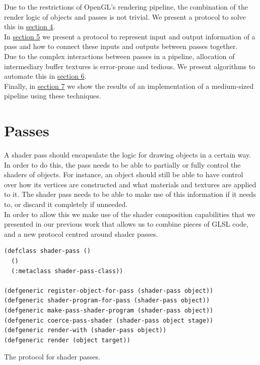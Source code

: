 \documentclass[format=sigconf]{acmart}
\begin{document}
Due to the restrictions of OpenGL's rendering pipeline, the combination of the render logic of objects and passes is not trivial. We present a protocol to solve this in \hyperref[passes]{section 4}. \\

In \hyperref[pipelines]{section 5} we present a protocol to represent input and output information of a pass and how to connect these inputs and outputs between passes together. \\

Due to the complex interactions between passes in a pipeline, allocation of intermediary buffer textures is error-prone and tedious. We present algorithms to automate this in \hyperref[allocation]{section 6}. \\

Finally, in \hyperref[concept]{section 7} we show the results of an implementation of a medium-sized pipeline using these techniques.

\section{Passes}\label{passes}
A shader pass should encapsulate the logic for drawing objects in a certain way. In order to do this, the pass needs to be able to partially or fully control the shaders of objects. For instance, an object should still be able to have control over how its vertices are constructed and what materials and textures are applied to it. The shader pass needs to be able to make use of this information if it needs to, or discard it completely if unneeded. \\

In order to allow this we make use of the shader composition capabilities that we presented in our previous work\cite{glsloop} that allows us to combine pieces of GLSL code, and a new protocol centred around shader passes.

\begin{listing}[h]
\begin{verbatim}
(defclass shader-pass ()
  ()
  (:metaclass shader-pass-class))

(defgeneric register-object-for-pass (shader-pass object))
(defgeneric shader-program-for-pass (shader-pass object))
(defgeneric make-pass-shader-program (shader-pass object))
(defgeneric coerce-pass-shader (shader-pass object stage))
(defgeneric render-with (shader-pass object))
(defgeneric render (object target))
\end{verbatim}
\caption{The protocol for shader passes.}
\label{lst:pass}
\end{listing}
\end{document}
